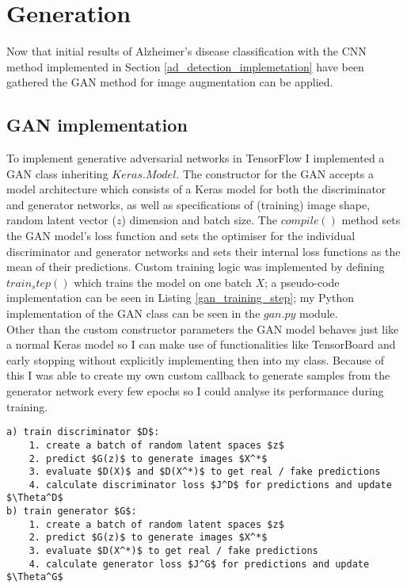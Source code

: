 \documentclass[
    author={Kai Hulme},
    supervisor={Dr Jon Bird},
    degree={BSc},
    title={Generative Adversarial Networks as an Augmentation Technique},
    subtitle={for Alzheimer's Disease Detection in MRI Volumes},
    type={Research},
    year={2021} 
]{dissertation}
\begin{document}
	
\section{Generation}

Now that initial results of Alzheimer's disease classification with the CNN method implemented in Section \ref{ad_detection_implemetation} have been gathered the GAN method for image augmentation can be applied.

\subsection{GAN implementation}

To implement generative adversarial networks in TensorFlow I implemented a GAN class inheriting $Keras.Model$. The constructor for the GAN accepts a model architecture which consists of a Keras model for both the discriminator and generator networks, as well as specifications of (training) image shape, random latent vector ($z$) dimension and batch size. The $compile()$ method sets the GAN model's loss function and sets the optimiser for the individual discriminator and generator networks and sets their internal loss functions as the mean of their predictions. Custom training logic was implemented by defining $train_step()$ which trains the model on one batch $X$; a pseudo-code implementation can be seen in Listing \ref{gan_training_step}; my Python implementation of the GAN class can be seen in the $gan.py$ module. \\ 

Other than the custom constructor parameters the GAN model behaves just like a normal Keras model so I can make use of functionalities like TensorBoard and early stopping without explicitly implementing then into my class. Because of this I was able to create my own custom callback to generate samples from the generator network every few epochs so I could analyse its performance during training.
	
\begin{lstlisting}[mathescape, float={t}, caption={Pseudo-code for a training step of the GAN model, i.e. training for one batch $X$, which consists of two main parts training the discriminator (a), then the generator (b).}, label={gan_training_step}]
a) train discriminator $D$:
    1. create a batch of random latent spaces $z$
    2. predict $G(z)$ to generate images $X^*$
    3. evaluate $D(X)$ and $D(X^*)$ to get real / fake predictions
    4. calculate discriminator loss $J^D$ for predictions and update $\Theta^D$
b) train generator $G$:
    1. create a batch of random latent spaces $z$
    2. predict $G(z)$ to generate images $X^*$
    3. evaluate $D(X^*)$ to get real / fake predictions
    4. calculate generator loss $J^G$ for predictions and update $\Theta^G$
\end{lstlisting}
		
\end{document}

